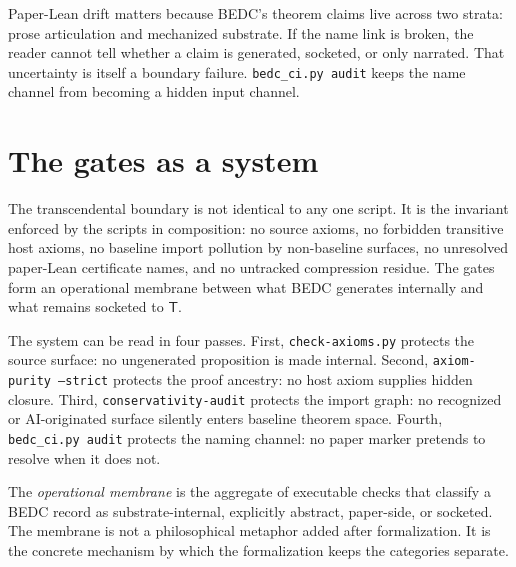 \begin{remark}
\label{rem:audit-gates-drift-boundary-failure}
Paper-Lean drift matters because BEDC's theorem claims live across two strata: prose articulation and mechanized substrate. If the name link is broken, the reader cannot tell whether a claim is generated, socketed, or only narrated. That uncertainty is itself a boundary failure. \texttt{bedc\_ci.py audit} keeps the name channel from becoming a hidden input channel.
\end{remark}

\section{The gates as a system}
\label{sec:audit-gates-as-system}

\begin{principle}
\label{prin:audit-gates-no-single-gate}
The transcendental boundary is not identical to any one script. It is the invariant enforced by the scripts in composition: no source axioms, no forbidden transitive host axioms, no baseline import pollution by non-baseline surfaces, no unresolved paper-Lean certificate names, and no untracked compression residue. The gates form an operational membrane between what BEDC generates internally and what remains socketed to $\mathsf{T}$.
\end{principle}

The system can be read in four passes. First, \texttt{check-axioms.py} protects the source surface: no ungenerated proposition is made internal. Second, \texttt{axiom-purity --strict} protects the proof ancestry: no host axiom supplies hidden closure. Third, \texttt{conservativity-audit} protects the import graph: no recognized or AI-originated surface silently enters baseline theorem space. Fourth, \texttt{bedc\_ci.py audit} protects the naming channel: no paper marker pretends to resolve when it does not.

\begin{definition}
\label{def:audit-gates-operational-membrane}
The \emph{operational membrane} is the aggregate of executable checks that classify a BEDC record as substrate-internal, explicitly abstract, paper-side, or socketed. The membrane is not a philosophical metaphor added after formalization. It is the concrete mechanism by which the formalization keeps the categories separate.
\end{definition}

